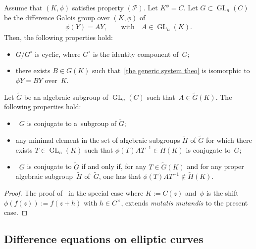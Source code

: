 \begin{Theorem}
\label{si prop P alors}
Assume that $(K,\phi)$ satisfies property $(\mathcal{P})$.
Let $K^{\phi} = C$.
Let $G \subset \operatorname{GL}_{n}(C)$ be the difference Galois group over $(K,\phi)$ of
\begin{gather}
\label{the generic system theo}
\phi(Y) = AY, \qquad \text{with} \quad  A \in \operatorname{GL}_{n}(K).
\end{gather}
Then, the following properties hold:
\begin{itemize}
\itemsep=0pt
\item $G/G^{\circ}$ is cyclic, where $G^{\circ}$ is the identity component of~$G$;
\item there exists $B \in G(K)$ such that~\eqref{the generic system theo} is isomorphic to $\phi Y=BY$ over~$K$.
\end{itemize}
Let $\widetilde{G}$ be an algebraic subgroup of $\operatorname{GL}_{n}(C)$ such that~$A\in \widetilde{G}(K)$.
The following properties hold:
\begin{itemize}
\itemsep=0pt
\item~$G$ is conjugate to a~subgroup of $\widetilde{G}$;
\item any minimal element in the set of algebraic subgroups $\widetilde{H}$ of $\widetilde{G}$ for which there exists
$T\in \operatorname{GL}_{n}(K)$ such that $\phi(T)AT^{-1}\in \widetilde{H}(K)$ is conjugate to~$G$;
\item~$G$ is conjugate to $\widetilde{G}$ if and only if, for any $T\in \widetilde{G}(K)$ and for any proper algebraic
sub\-group~$\widetilde{H}$ of~$\widetilde{G}$, one has that $\phi(T)AT^{-1}\notin \widetilde{H}(K)$.
\end{itemize}
\end{Theorem}

\begin{proof}
The proof of~\cite[Propositions~1.20 and~1.21]{VdPS97} in the special case where $K:=C(z)$ and~$\phi$ is the shift
$\phi(f(z)):=f(z+h)$ with $h \in C^\times$, extends {\it mutatis mutandis} to the present case.
\end{proof}

\subsection{Dif\/ference equations on elliptic curves}

